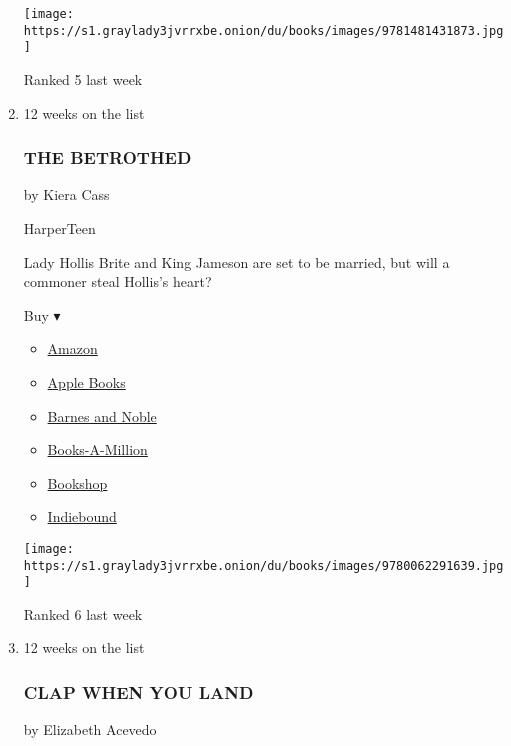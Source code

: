 \begin{enumerate}
  \texttt{[image: https://s1.graylady3jvrrxbe.onion/du/books/images/9781481431873.jpg]}

  Ranked 5 last week
\item
  12 weeks on the list

  \hypertarget{the-betrothed}{%
  \subsubsection{THE BETROTHED}\label{the-betrothed}}

  by Kiera Cass

  HarperTeen

  Lady Hollis Brite and King Jameson are set to be married, but will a
  commoner steal Hollis's heart?

  Buy ▾

  \begin{itemize}
  \tightlist
  \item
    \href{https://www.amazon.com/dp/0062291637?tag=NYTBSREV-20\&tag=NYTBS-20}{Amazon}
  \item
    \href{https://du-gae-books-dot-nyt-du-prd.appspot.com/buy?title=THE+BETROTHED\&author=Kiera+Cass}{Apple
    Books}
  \item
    \href{https://www.anrdoezrs.net/click-7990613-11819508?url=https\%3A\%2F\%2Fwww.barnesandnoble.com\%2Fw\%2F\%3Fean\%3D9780062291639}{Barnes
    and Noble}
  \item
    \href{https://www.anrdoezrs.net/click-7990613-35140?url=https\%3A\%2F\%2Fwww.booksamillion.com\%2Fp\%2FTHE\%2BBETROTHED\%2FKiera\%2BCass\%2F9780062291639}{Books-A-Million}
  \item
    \href{https://bookshop.org/a/3546/9780062291639}{Bookshop}
  \item
    \href{https://www.indiebound.org/book/9780062291639?aff=NYT}{Indiebound}
  \end{itemize}

  \texttt{[image: https://s1.graylady3jvrrxbe.onion/du/books/images/9780062291639.jpg]}

  Ranked 6 last week
\item
  12 weeks on the list

  \hypertarget{clap-when-you-land}{%
  \subsubsection{CLAP WHEN YOU LAND}\label{clap-when-you-land}}

  by Elizabeth Acevedo


\end{enumerate}

